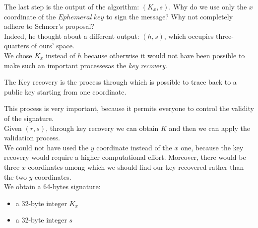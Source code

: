 
The last step is the output of the algorithm: $(K_{x},s)$.
Why do we use only the $x$ coordinate of the $Ephemeral\ key$ to sign the message? Why not completely adhere to Schnorr's proposal?\\
Indeed, he thought about a different output: $(h,s)$, which occupies three-quarters of ours' space.\\
We chose $K_{x}$ instead of $h$ because otherwise it would not have been possible to make such an important processesas the \textit{key recovery}.

\begin{teorema}
	The Key recovery is the process through which is possible to trace back to a public key starting from one coordinate.
\end{teorema}

This process is very important, because it permits everyone to control the validity of the signature.\\
Given $(r,s)$, through key recovery we can obtain $K$ and then we can apply the validation process.\\
We could not have used the $y$ coordinate instead of the $x$ one, because the key recovery would require a higher computational effort. Moreover, there would be three $x$ coordinates among which we should find our key recovered rather than the two $y$ coordinates.\\
We obtain a 64-bytes signature:
\begin{itemize}
	\item a 32-byte integer $K_{x}$
	\item a 32-byte integer $s$ \\
\end{itemize}


